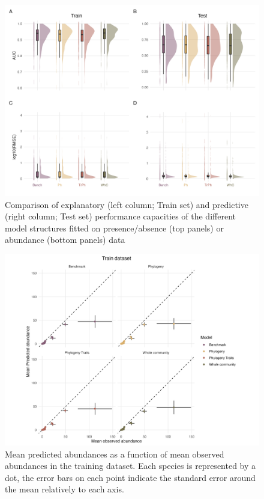 \begin{figure}
\hypertarget{fig:chapt1supp17}{%
\centering
\includegraphics{03-Chapitre1/figures/supplementary/fig_supp17.png}
\caption{Comparison of explanatory (left column; Train set) and
predictive (right column; Test set) performance capacities of the
different model structures fitted on presence/absence (top panels) or
abundance (bottom panels) data}\label{fig:chapt1supp17}
}
\end{figure}

\begin{figure}
\hypertarget{fig:chapt1supp18}{%
\centering
\includegraphics{03-Chapitre1/figures/supplementary/fig_supp18.png}
\caption{Mean predicted abundances as a function of mean observed
abundances in the training dataset. Each species is represented by a
dot, the error bars on each point indicate the standard error around the
mean relatively to each axis.}\label{fig:chapt1supp18}
}
\end{figure}

